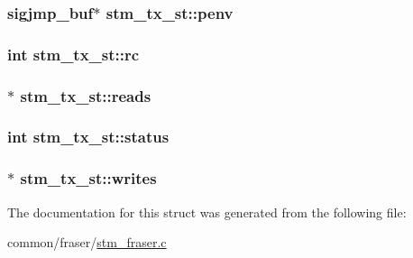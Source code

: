\hypertarget{structstm__tx__st_a3e1745e8e19bae7c5da6790562210648}{
\subsubsection[{penv}]{\setlength{\rightskip}{0pt plus 5cm}sigjmp\-\_\-buf$\ast$ stm\-\_\-tx\-\_\-st\-::penv}}\label{structstm__tx__st_a3e1745e8e19bae7c5da6790562210648}
\hypertarget{structstm__tx__st_a1fcafa795a98eb07e0822ce72aff5b05}{
\subsubsection[{rc}]{\setlength{\rightskip}{0pt plus 5cm}int stm\-\_\-tx\-\_\-st\-::rc}}\label{structstm__tx__st_a1fcafa795a98eb07e0822ce72aff5b05}
\hypertarget{structstm__tx__st_ac348497da14526917aede588c08fcecf}{
\subsubsection[{reads}]{$\ast$ stm\-\_\-tx\-\_\-st\-::reads}}\label{structstm__tx__st_ac348497da14526917aede588c08fcecf}
\hypertarget{structstm__tx__st_a1a63d8bd2ac112e17241b81773f3de75}{
\subsubsection[{status}]{\setlength{\rightskip}{0pt plus 5cm}int stm\-\_\-tx\-\_\-st\-::status}}\label{structstm__tx__st_a1a63d8bd2ac112e17241b81773f3de75}
\hypertarget{structstm__tx__st_a9572cc71b02430ce9ccd5e305dd313f3}{
\subsubsection[{writes}]{$\ast$ stm\-\_\-tx\-\_\-st\-::writes}}\label{structstm__tx__st_a9572cc71b02430ce9ccd5e305dd313f3}


The documentation for this struct was generated from the following file\-:\begin{DoxyCompactItemize}
\item 
common/fraser/\hyperlink{stm__fraser_8c}{stm\-\_\-fraser.\-c}\end{DoxyCompactItemize}

